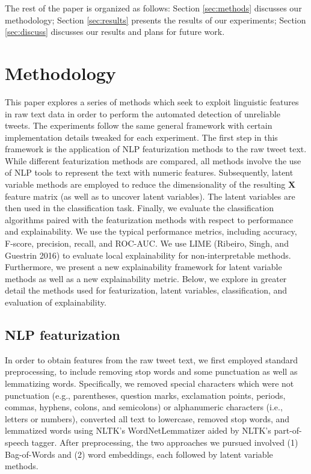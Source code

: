 \documentclass{article}
\begin{document}
The rest of the paper is organized as follows: Section \ref{sec:methods}
discusses our methodology; Section \ref{sec:results} presents the
results of our experiments; Section \ref{sec:discuss} discusses our
results and plans for future work.

\hypertarget{methodology}{%
\section{Methodology}\label{methodology}}

\label{sec:methods} This paper explores a series of methods which seek
to exploit linguistic features in raw text data in order to perform the
automated detection of unreliable tweets. The experiments follow the
same general framework with certain implementation details tweaked for
each experiment. The first step in this framework is the application of
NLP featurization methods to the raw tweet text. While different
featurization methods are compared, all methods involve the use of NLP
tools to represent the text with numeric features. Subsequently, latent
variable methods are employed to reduce the dimensionality of the
resulting \(\mathbf{X}\) feature matrix (as well as to uncover latent
variables). The latent variables are then used in the classification
task. Finally, we evaluate the classification algorithms paired with the
featurization methods with respect to performance and explainability. We
use the typical performance metrics, including accuracy, F-score,
precision, recall, and ROC-AUC. We use LIME (Ribeiro, Singh, and
Guestrin 2016) to evaluate local explainability for non-interpretable
methods. Furthermore, we present a new explainability framework for
latent variable methods as well as a new explainability metric. Below,
we explore in greater detail the methods used for featurization, latent
variables, classification, and evaluation of explainability.

\hypertarget{nlp-featurization}{%
\subsection{NLP featurization}\label{nlp-featurization}}

In order to obtain features from the raw tweet text, we first employed
standard preprocessing, to include removing stop words and some
punctuation as well as lemmatizing words. Specifically, we removed
special characters which were not punctuation (e.g., parentheses,
question marks, exclamation points, periods, commas, hyphens, colons,
and semicolons) or alphanumeric characters (i.e., letters or numbers),
converted all text to lowercase, removed stop words, and lemmatized
words using NLTK's WordNetLemmatizer aided by NLTK's part-of-speech
tagger. After preprocessing, the two approaches we pursued involved (1)
Bag-of-Words and (2) word embeddings, each followed by latent variable
methods.
\end{document}
